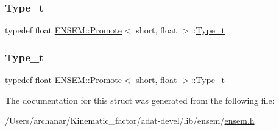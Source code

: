 \mbox{\label{structENSEM_1_1Promote_3_01short_00_01float_01_4_a1d4ac20ed44f25a8d1863eda583b89da}} 
\subsubsection{\texorpdfstring{Type\_t}{Type\_t}\hspace{0.1cm}{\footnotesize\ttfamily [2/3]}}
{\footnotesize\ttfamily typedef float \mbox{\hyperlink{structENSEM_1_1Promote}{E\+N\+S\+E\+M\+::\+Promote}}$<$ short, float $>$\+::\mbox{\hyperlink{structENSEM_1_1Promote_3_01short_00_01float_01_4_a1d4ac20ed44f25a8d1863eda583b89da}{Type\+\_\+t}}}

\mbox{\label{structENSEM_1_1Promote_3_01short_00_01float_01_4_a1d4ac20ed44f25a8d1863eda583b89da}} 
\subsubsection{\texorpdfstring{Type\_t}{Type\_t}\hspace{0.1cm}{\footnotesize\ttfamily [3/3]}}
{\footnotesize\ttfamily typedef float \mbox{\hyperlink{structENSEM_1_1Promote}{E\+N\+S\+E\+M\+::\+Promote}}$<$ short, float $>$\+::\mbox{\hyperlink{structENSEM_1_1Promote_3_01short_00_01float_01_4_a1d4ac20ed44f25a8d1863eda583b89da}{Type\+\_\+t}}}



The documentation for this struct was generated from the following file\+:\begin{DoxyCompactItemize}
\item 
/\+Users/archanar/\+Kinematic\+\_\+factor/adat-\/devel/lib/ensem/\mbox{\hyperlink{adat-devel_2lib_2ensem_2ensem_8h}{ensem.\+h}}\end{DoxyCompactItemize}
